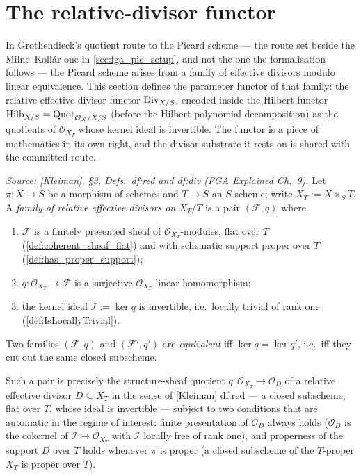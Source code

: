 \section{The relative-divisor functor}
\label{sec:div_functor}

In Grothendieck's quotient route to the Picard scheme --- the route set beside
the Milne--Koll\'ar one in \cref{sec:fga_pic_setup}, and not the one the
formalisation follows --- the Picard scheme arises from a family of effective
divisors modulo linear equivalence.  This section defines the parameter functor
of that family: the relative-effective-divisor functor \(\operatorname{Div}_{X/S}\), encoded
inside the Hilbert functor \(\operatorname{Hilb}_{X/S} = \operatorname{Quot}_{\mathcal O_X/X/S}\) (before the
Hilbert-polynomial decomposition) as the quotients of
\(\mathcal O_{X_T}\) whose kernel ideal is invertible.  The functor is a piece of
mathematics in its own right, and the divisor substrate it rests on is shared
with the committed route.

\begin{definition}\leanok
  \label{def:div_family}
  \textit{Source: [Kleiman], \S 3, Defs.~df:red and df:div (FGA Explained
  Ch.~9).}
  Let \(\pi : X \to S\) be a morphism of schemes and \(T \to S\) an
  \(S\)-scheme; write \(X_T := X \times_S T\).  A \emph{family of relative
  effective divisors on \(X_T/T\)} is a pair \((\mathcal F, q)\) where
  \begin{enumerate}
    \item \(\mathcal F\) is a finitely presented sheaf of
      \(\mathcal O_{X_T}\)-modules, flat over \(T\)
      (\cref{def:coherent_sheaf_flat}) and with schematic support proper
      over \(T\) (\cref{def:has_proper_support});
    \item \(q : \mathcal O_{X_T} \twoheadrightarrow \mathcal F\) is a
      surjective \(\mathcal O_{X_T}\)-linear homomorphism;
    \item the kernel ideal \(\mathcal I := \ker q\) is invertible, i.e.\
      locally trivial of rank one (\cref{def:IsLocallyTrivial}).
  \end{enumerate}
  Two families \((\mathcal F, q)\) and \((\mathcal F', q')\) are
  \emph{equivalent} iff \(\ker q = \ker q'\), i.e.\ iff they cut out the same
  closed subscheme.

  Such a pair is precisely the structure-sheaf quotient
  \(q : \mathcal O_{X_T} \to \mathcal O_D\) of a relative effective divisor
  \(D \subseteq X_T\) in the sense of [Kleiman] df:red --- a closed
  subscheme, flat over \(T\), whose ideal is invertible --- subject to two
  conditions that are automatic in the regime of interest: finite
  presentation of \(\mathcal O_D\) always holds (\(\mathcal O_D\) is the
  cokernel of \(\mathcal I \hookrightarrow \mathcal O_{X_T}\) with
  \(\mathcal I\) locally free of rank one), and properness of the support
  \(D\) over \(T\) holds whenever \(\pi\) is proper (a closed subscheme of
  the \(T\)-proper \(X_T\) is proper over \(T\)).
\end{definition}

